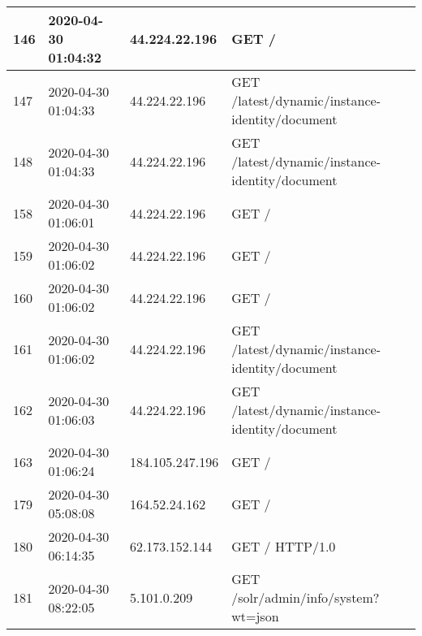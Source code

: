 \documentclass[12pt]{article}
\begin{document}
\begin{longtable}{|l|l|l|l|}
146 & 2020-04-30 01:04:32 & 44.224.22.196   & GET /                                                                                                                               \\ \hline
147 & 2020-04-30 01:04:33 & 44.224.22.196   & GET /latest/dynamic/instance-identity/document                                                                                      \\ \hline
148 & 2020-04-30 01:04:33 & 44.224.22.196   & GET /latest/dynamic/instance-identity/document                                                                                      \\ \hline
158 & 2020-04-30 01:06:01 & 44.224.22.196   & GET /                                                                                                                               \\ \hline
159 & 2020-04-30 01:06:02 & 44.224.22.196   & GET /                                                                                                                               \\ \hline
160 & 2020-04-30 01:06:02 & 44.224.22.196   & GET /                                                                                                                               \\ \hline
161 & 2020-04-30 01:06:02 & 44.224.22.196   & GET /latest/dynamic/instance-identity/document                                                                                      \\ \hline
162 & 2020-04-30 01:06:03 & 44.224.22.196   & GET /latest/dynamic/instance-identity/document                                                                                      \\ \hline
163 & 2020-04-30 01:06:24 & 184.105.247.196 & GET /                                                                                                                               \\ \hline
179 & 2020-04-30 05:08:08 & 164.52.24.162   & GET /                                                                                                                               \\ \hline
180 & 2020-04-30 06:14:35 & 62.173.152.144  & GET / HTTP/1.0                                                                                                                      \\ \hline
181 & 2020-04-30 08:22:05 & 5.101.0.209     & GET /solr/admin/info/system?wt=json                                                                                                 \\ \hline

\end{longtable}
\end{document}
